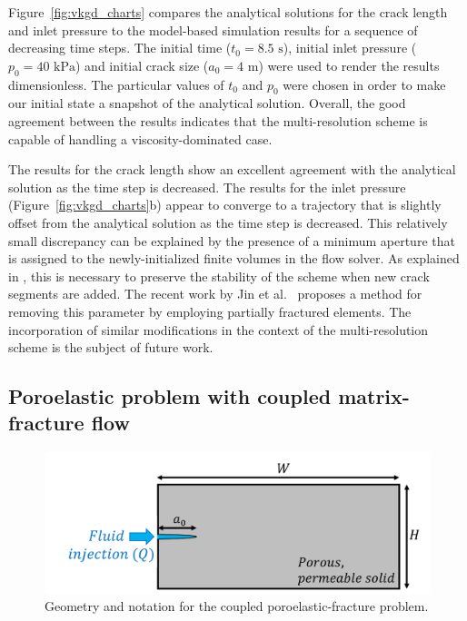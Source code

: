 Figure~\ref{fig:vkgd_charts} compares the analytical solutions for the crack length and inlet pressure to the model-based simulation results for a sequence of decreasing time steps.   The initial  time ($t_0 = 8.5 \text{ s}$), initial inlet pressure ($p_0 = 40 \text{ kPa}$) and initial crack size ($a_0 = 4\text{ m}$) were used to render the results dimensionless.   The particular values of $t_0$ and $p_0$ were chosen in order to make our initial state a snapshot of the analytical solution. Overall, the good agreement between the results indicates that the multi-resolution scheme is capable of handling a viscosity-dominated case.    

The results for the crack length show an excellent agreement with the analytical solution as the time step is decreased. The results for the inlet pressure (Figure~\ref{fig:vkgd_charts}b) appear to converge to a trajectory that is slightly offset from the analytical solution as the time step is decreased.  This relatively small discrepancy  can be explained by the presence of a minimum aperture that is assigned to the newly-initialized finite volumes in the flow solver.  As explained in \cite{settgast2017fully}, this is necessary to preserve the stability of the scheme when new crack segments are added. The recent work by Jin et al.~\cite{jin2022robust} proposes a method for removing this parameter by employing partially fractured elements. The incorporation of similar modifications in the context of the multi-resolution scheme is the subject of future work. 

\subsection{Poroelastic problem with coupled matrix-fracture flow }

\begin{figure}[!htbp]
    \centering
    \includegraphics[width=.9\linewidth]{img/comparison_prob/miehe_prob_schematic.png}
    \caption{Geometry and notation for the coupled poroelastic-fracture problem.}
    \label{fig:geometry_miehe}
\end{figure}

